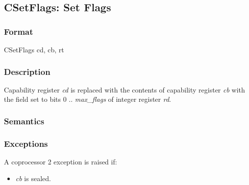 \clearpage
{}
{}
\subsection*{CSetFlags: Set Flags}

\subsubsection*{Format}

CSetFlags cd, cb, rt

\begin{center}
\end{center}

\subsubsection*{Description}

Capability register \emph{cd} is replaced with the contents of capability
register \emph{cb} with the \cflags{} field set to bits 0 .. \emph{max\_flags} of
integer register \emph{rd}.


\subsubsection*{Semantics}

\subsubsection*{Exceptions}

A coprocessor 2 exception is raised if:

\begin{itemize}
\item
\emph{cb} is sealed.
\end{itemize}
